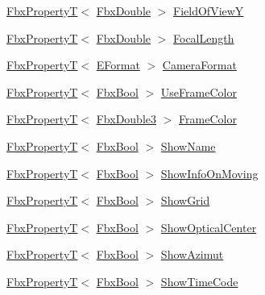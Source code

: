 \begin{DoxyCompactItemize}
\hyperlink{class_fbx_property_t}{Fbx\+PropertyT}$<$ \hyperlink{fbxtypes_8h_a171e72a1c46fc15c1a6c9c31948c1c5b}{Fbx\+Double} $>$ \hyperlink{class_fbx_camera_a924b7ae9b8256f04bd36d726f0131c98}{Field\+Of\+ViewY}
\item 
\hyperlink{class_fbx_property_t}{Fbx\+PropertyT}$<$ \hyperlink{fbxtypes_8h_a171e72a1c46fc15c1a6c9c31948c1c5b}{Fbx\+Double} $>$ \hyperlink{class_fbx_camera_afee5193f8423491a47a059d93cee61c3}{Focal\+Length}
\item 
\hyperlink{class_fbx_property_t}{Fbx\+PropertyT}$<$ \hyperlink{class_fbx_camera_a88d68c983d21e4d6c0f281a8a30f0a06}{E\+Format} $>$ \hyperlink{class_fbx_camera_aa597919c9a693becd2647b969604e401}{Camera\+Format}
\item 
\hyperlink{class_fbx_property_t}{Fbx\+PropertyT}$<$ \hyperlink{fbxtypes_8h_a92e0562b2fe33e76a242f498b362262e}{Fbx\+Bool} $>$ \hyperlink{class_fbx_camera_a891e6eb1c91dd3a47dc05547149825e3}{Use\+Frame\+Color}
\item 
\hyperlink{class_fbx_property_t}{Fbx\+PropertyT}$<$ \hyperlink{fbxtypes_8h_ae0a96f14cde566774c7553aa7523b7a7}{Fbx\+Double3} $>$ \hyperlink{class_fbx_camera_ae032c4d73824601774f06ce4375943cd}{Frame\+Color}
\item 
\hyperlink{class_fbx_property_t}{Fbx\+PropertyT}$<$ \hyperlink{fbxtypes_8h_a92e0562b2fe33e76a242f498b362262e}{Fbx\+Bool} $>$ \hyperlink{class_fbx_camera_a2cc4a7d5d9972b289c6d1a175e2adf1d}{Show\+Name}
\item 
\hyperlink{class_fbx_property_t}{Fbx\+PropertyT}$<$ \hyperlink{fbxtypes_8h_a92e0562b2fe33e76a242f498b362262e}{Fbx\+Bool} $>$ \hyperlink{class_fbx_camera_a15b36db580c994a2676fd18d41923953}{Show\+Info\+On\+Moving}
\item 
\hyperlink{class_fbx_property_t}{Fbx\+PropertyT}$<$ \hyperlink{fbxtypes_8h_a92e0562b2fe33e76a242f498b362262e}{Fbx\+Bool} $>$ \hyperlink{class_fbx_camera_ac44b2aec0ace4b978979e5bd3f9cd384}{Show\+Grid}
\item 
\hyperlink{class_fbx_property_t}{Fbx\+PropertyT}$<$ \hyperlink{fbxtypes_8h_a92e0562b2fe33e76a242f498b362262e}{Fbx\+Bool} $>$ \hyperlink{class_fbx_camera_a76d80815967bce91e0fded44a6fbe74c}{Show\+Optical\+Center}
\item 
\hyperlink{class_fbx_property_t}{Fbx\+PropertyT}$<$ \hyperlink{fbxtypes_8h_a92e0562b2fe33e76a242f498b362262e}{Fbx\+Bool} $>$ \hyperlink{class_fbx_camera_a7f2e404049521f2b8ed8793bb231d9a0}{Show\+Azimut}
\item 
\hyperlink{class_fbx_property_t}{Fbx\+PropertyT}$<$ \hyperlink{fbxtypes_8h_a92e0562b2fe33e76a242f498b362262e}{Fbx\+Bool} $>$ \hyperlink{class_fbx_camera_a26906a88450a20a23eef13ecec0a4871}{Show\+Time\+Code}

\end{DoxyCompactItemize}
